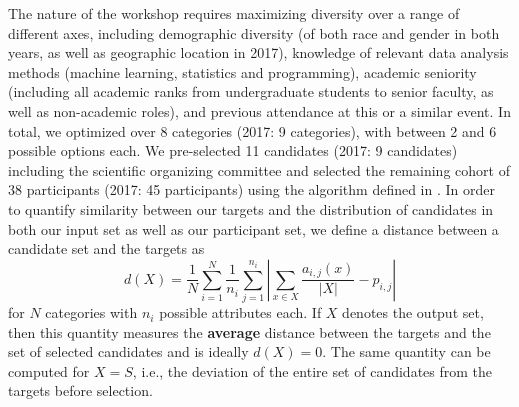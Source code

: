 \documentclass[12pt]{article}
\begin{document}
The nature of the workshop requires maximizing diversity over a range of different axes, including demographic diversity (of both race and gender in both years, as well as geographic location in 2017), knowledge of relevant data analysis methods (machine learning, statistics and programming), academic seniority (including all academic ranks from undergraduate students to senior faculty, as well as non-academic roles), and previous attendance at this or a similar event. In total, we optimized over 8 categories (2017: 9 categories), with between 2 and 6 possible options each. 
We pre-selected 11 candidates (2017: 9 candidates) including the scientific organizing committee and selected the remaining cohort of 38 participants (2017: 45 participants) using the algorithm defined in . In order to quantify similarity between our targets and the distribution of candidates in both our input set as well as our participant set, we define a distance between a candidate set and the targets as 
\begin{equation}
d(X) = \frac{1}{N}\sum_{i=1}^{N} \frac{1}{n_i}\sum_{j=1}^{n_i}\left| \sum_{x \in X} \frac{a_{i,j}(x)}{|X|} - p_{i,j} \right| 
\end{equation}
for $N$ categories with $n_i$ possible attributes each. If $X$ denotes the output set, then this quantity measures the \textbf{average} distance between the targets and the set of selected candidates and is ideally $d(X)=0$. The same quantity can be computed for $X = S$, i.e., the deviation of the entire set of candidates from the targets before selection.
\end{document}
